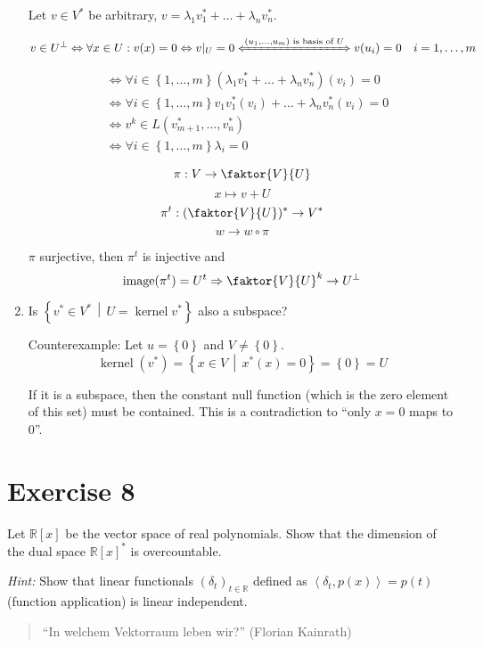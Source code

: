 \documentclass[a4paper]{article}
\theoremstyle{definition}
\DeclareMathOperator\kernel{kernel}
\newcommand\set[1]{\left\{#1\right\}}
\newcommand\setdef[2]{\left\{#1\,\middle|\,#2\right\}}
\newcommand\fun[1]{\left\langle{#1}\right\rangle}
\begin{document}
\begin{enumerate}
    Let $v \in V^*$ be arbitrary, $v = \lambda_1 v_1^* + \ldots + \lambda_n v_n^*$.

    \[ v \in U^\bot \Leftrightarrow \forall x \in U: v(x) = 0 \Leftrightarrow v|_{U} = 0 \xLeftrightarrow{(u_1,\ldots, u_m) \text{ is basis of } U} v(u_i) = 0 \quad i = 1, \ldots, m \]
    \begin{align*}
        &\Leftrightarrow \forall i \in \set{1, \ldots, m} (\lambda_1 v^*_1 + \ldots + \lambda_n v^*_n)(v_i) = 0 \\
        &\Leftrightarrow \forall i \in \set{1, \ldots, m} v_1 v^*_1(v_i) + \ldots + \lambda_n v_n^*(v_i) = 0 \\
        &\Leftrightarrow v^k \in L(v^*_{m+1}, \ldots, v^*_n) \\
        &\Leftrightarrow \forall i \in \set{1, \ldots, m} \lambda_i = 0
    \end{align*}

    \[ \pi: V \to \faktor{V}{U} \]
    \[ x \mapsto v + U \]
    \[ \pi^t: (\faktor{V}{U})^* \to V^* \]
    \[ w \to w \circ \pi \]

    $\pi$ surjective, then $\pi^t$ is injective and
    \[ \operatorname{image}(\pi^t) = U^t \Rightarrow \faktor{V}{U}^k \to U^\bot \]

  \item
    Is $\setdef{v^* \in V^*}{U = \kernel{v^*}}$ also a subspace?

    Counterexample:
    Let $u = \set{0}$ and $V \neq \set{0}$.
    \[ \kernel(v^*) = \setdef{x \in V}{x^*(x) = 0} = \set{0} = U \]

    If it is a subspace, then the constant null function (which is the zero element of this set) must be contained.
    This is a contradiction to \enquote{only $x=0$ maps to $0$}.
\end{enumerate}

\section{Exercise 8}
\begin{ex}
  Let $\mathbb R[x]$ be the vector space of real polynomials.
  Show that the dimension of the dual space $\mathbb R[x]^*$ is overcountable.

  \emph{Hint:} Show that linear functionals $(\delta_t)_{t \in \mathbb R}$ defined
  as $\fun{\delta_t, p(x)} = p(t)$ (function application) is linear independent.
\end{ex}

\begin{quote}
  \enquote{In welchem Vektorraum leben wir?} (Florian Kainrath)
\end{quote}
\end{document}
